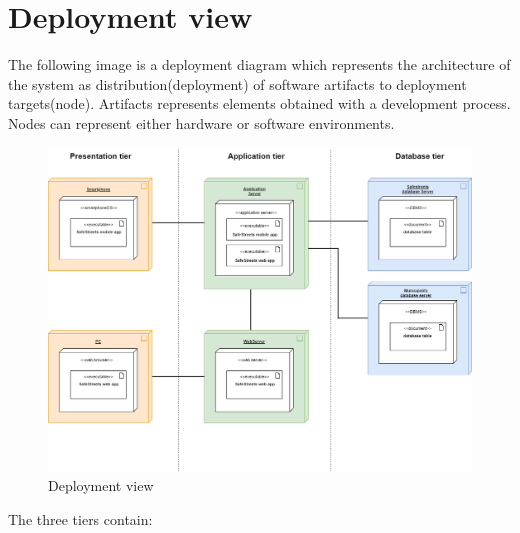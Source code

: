     \section{Deployment view}
    The following image is a deployment diagram which represents the
    architecture of the system as distribution(deployment) of software artifacts
    to deployment targets(node). Artifacts represents elements obtained with a
    development process. Nodes can represent either hardware or software
    environments.
    \begin{figure}[H]
        \includegraphics[scale=0.35]{dd/resources/images/DeploymentDiagram.png}
        \caption{Deployment view}        
    \end{figure}
    The three tiers contain:
